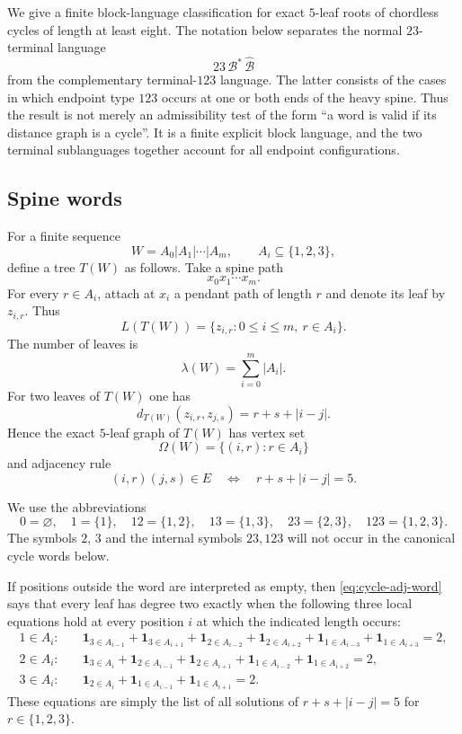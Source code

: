 \documentclass[11pt]{article}
\theoremstyle{definition}
\begin{document}
We give a finite block-language classification for exact $5$-leaf roots of chordless cycles of length at least eight.  The notation below separates the normal $23$-terminal language
\[
  23\,\mathcal B^{*}\,\widehat{\mathcal B}
\]
from the complementary terminal-$123$ language.  The latter consists of the cases in which endpoint type $123$ occurs at one or both ends of the heavy spine.  Thus the result is not merely an admissibility test of the form ``a word is valid if its distance graph is a cycle''.  It is a finite explicit block language, and the two terminal sublanguages together account for all endpoint configurations.

\subsection*{Spine words}

For a finite sequence
\[
 W=A_0|A_1|\cdots|A_m,
 \qquad A_i\subseteq\{1,2,3\},
\]
define a tree $T(W)$ as follows.  Take a spine path
\[
 x_0x_1\cdots x_m.
\]
For every $r\in A_i$, attach at $x_i$ a pendant path of length $r$ and denote its leaf by $z_{i,r}$.  Thus
\[
 L(T(W))=\{z_{i,r}:0\le i\le m,\ r\in A_i\}.
\]
The number of leaves is
\[
 \lambda(W)=\sum_{i=0}^{m}|A_i|.
\]
For two leaves of $T(W)$ one has
\begin{equation}\label{eq:cycle-distance-word}
 d_{T(W)}(z_{i,r},z_{j,s})=r+s+|i-j|.
\end{equation}
Hence the exact $5$-leaf graph of $T(W)$ has vertex set
\[
 \Omega(W)=\{(i,r):r\in A_i\}
\]
and adjacency rule
\begin{equation}\label{eq:cycle-adj-word}
 (i,r)(j,s)\in E\quad\Longleftrightarrow\quad r+s+|i-j|=5.
\end{equation}

We use the abbreviations
\[
0=\varnothing,\quad
1=\{1\},\quad
12=\{1,2\},\quad
13=\{1,3\},\quad
23=\{2,3\},\quad
123=\{1,2,3\}.
\]
The symbols $2$, $3$ and the internal symbols $23,123$ will not occur in the canonical cycle words below.

If positions outside the word are interpreted as empty, then \eqref{eq:cycle-adj-word} says that every leaf has degree two exactly when the following three local equations hold at every position $i$ at which the indicated length occurs:
\begin{align}
1\in A_i:
&\quad
\mathbf 1_{3\in A_{i-1}}+\mathbf 1_{3\in A_{i+1}}
+\mathbf 1_{2\in A_{i-2}}+\mathbf 1_{2\in A_{i+2}}
+\mathbf 1_{1\in A_{i-3}}+\mathbf 1_{1\in A_{i+3}}=2,
\tag{D1}\label{eq:deg-one}\\
2\in A_i:
&\quad
\mathbf 1_{3\in A_i}
+\mathbf 1_{2\in A_{i-1}}+\mathbf 1_{2\in A_{i+1}}
+\mathbf 1_{1\in A_{i-2}}+\mathbf 1_{1\in A_{i+2}}=2,
\tag{D2}\label{eq:deg-two}\\
3\in A_i:
&\quad
\mathbf 1_{2\in A_i}
+\mathbf 1_{1\in A_{i-1}}+\mathbf 1_{1\in A_{i+1}}=2.
\tag{D3}\label{eq:deg-three}
\end{align}
These equations are simply the list of all solutions of $r+s+|i-j|=5$ for $r\in\{1,2,3\}$.
\end{document}
